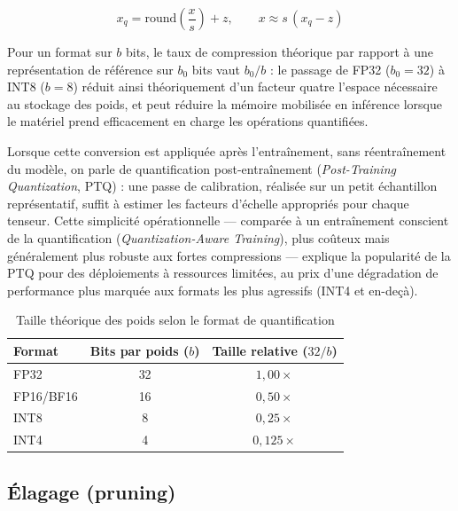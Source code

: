 \begin{equation}
    x_q = \mathrm{round}\!\left(\frac{x}{s}\right) + z, \qquad x \approx s\,(x_q - z)
\end{equation}

Pour un format sur $b$ bits, le taux de compression théorique par rapport à une représentation de référence sur $b_0$ bits vaut $b_0/b$ : le passage de FP32 ($b_0=32$) à INT8 ($b=8$) réduit ainsi théoriquement d'un facteur quatre l'espace nécessaire au stockage des poids, et peut réduire la mémoire mobilisée en inférence lorsque le matériel prend efficacement en charge les opérations quantifiées.

Lorsque cette conversion est appliquée après l'entraînement, sans réentraînement du modèle, on parle de quantification post-entraînement (\textit{Post-Training Quantization}, PTQ) : une passe de calibration, réalisée sur un petit échantillon représentatif, suffit à estimer les facteurs d'échelle appropriés pour chaque tenseur.
Cette simplicité opérationnelle --- comparée à un entraînement conscient de la quantification (\textit{Quantization-Aware Training}), plus coûteux mais généralement plus robuste aux fortes compressions --- explique la popularité de la PTQ pour des déploiements à ressources limitées, au prix d'une dégradation de performance plus marquée aux formats les plus agressifs (INT4 et en-deçà).

\begin{table}[H]
    \centering
    \small
    \caption{Taille théorique des poids selon le format de quantification}
    \label{tab:quantification}
    \begin{tabular}{lcc}
        \toprule
        \textbf{Format} & \textbf{Bits par poids ($b$)} & \textbf{Taille relative ($32/b$)} \\
        \midrule
        FP32            & 32                            & $1{,}00\times$                    \\
        FP16/BF16       & 16                            & $0{,}50\times$                    \\
        INT8            & 8                             & $0{,}25\times$                    \\
        INT4            & 4                             & $0{,}125\times$                   \\
        \bottomrule
    \end{tabular}
\end{table}

\subsection{Élagage (pruning)}
\label{sec:pruning}

